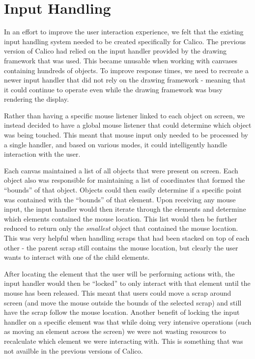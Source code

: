 \section{Input Handling}
In an effort to improve the user interaction experience, we felt that the existing input handling system needed to be created specifically for Calico. The previous version of Calico had relied on the input handler provided by the drawing framework that was used. This became unusable when working with canvases containing hundreds of objects. To improve response times, we need to recreate a newer input handler that did not rely on the drawing framework - meaning that it could continue to operate even while the drawing framework was busy rendering the display.

Rather than having a specific mouse listener linked to each object on screen, we instead decided to have a global mouse listener that could determine which object was being touched. This meant that mouse input only needed to be processed by a single handler, and based on various modes, it could intelligently handle interaction with the user. 

Each canvas maintained a list of all objects that were present on screen. Each object also was responsible for maintaining a list of coordinates that formed the ``bounds'' of that object. Objects could then easily determine if a specific point was contained with the ``bounds'' of that element.
Upon receiving any mouse input, the input handler would then iterate through the elements and determine which elements contained the mouse location. This list would then be further reduced to return only the \emph{smallest} object that contained the mouse location. This was very helpful when handling scraps that had been stacked on top of each other - the parent scrap still contains the mouse location, but clearly the user wants to interact with one of the child elements.

After locating the element that the user will be performing actions with, the input handler would then be ``locked'' to only interact with that element until the mouse has been released. This meant that users could move a scrap around screen (and move the mouse outside the bounds of the selected scrap) and still have the scrap follow the mouse location. Another benefit of locking the input handler on a specific element was that while doing very intensive operations (such as moving an element across the screen) we were not wasting resources to recalculate which element we were interacting with. This is something that was not availble in the previous versions of Calico.

